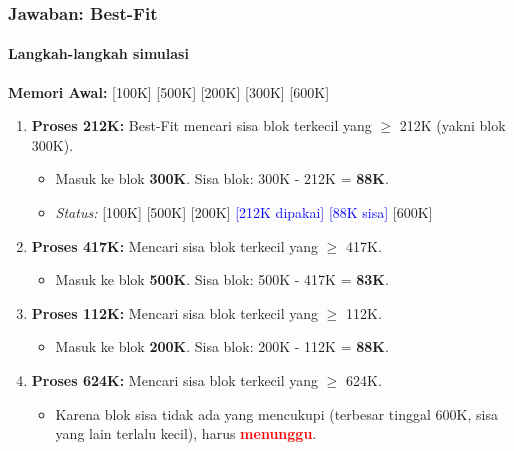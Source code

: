 \documentclass[t,aspectratio=169,xcolor=dvipsnames]{beamer}
\newcommand{\tem}[1]{\textbf{\textcolor{red}{#1}}}
\begin{document}
\begin{frame}
    \frametitle{Jawaban: Best-Fit}
    \framesubtitle{Langkah-langkah simulasi}
    \small
    \textbf{Memori Awal:} [100K] [500K] [200K] [300K] [600K]
    
    \begin{enumerate}
        \item \textbf{Proses 212K:} Best-Fit mencari sisa blok terkecil yang $\ge$ 212K (yakni blok 300K).
        \begin{itemize}
            \item Masuk ke blok \textbf{300K}. Sisa blok: 300K - 212K = \textbf{88K}.
            \item \textit{Status:} [100K] [500K] [200K] \textcolor{blue}{[212K dipakai] [88K sisa]} [600K]
        \end{itemize}
        \item \textbf{Proses 417K:} Mencari sisa blok terkecil yang $\ge$ 417K.
        \begin{itemize}
            \item Masuk ke blok \textbf{500K}. Sisa blok: 500K - 417K = \textbf{83K}.
        \end{itemize}
        \item \textbf{Proses 112K:} Mencari sisa blok terkecil yang $\ge$ 112K.
        \begin{itemize}
            \item Masuk ke blok \textbf{200K}. Sisa blok: 200K - 112K = \textbf{88K}.
        \end{itemize}
        \item \textbf{Proses 624K:} Mencari sisa blok terkecil yang $\ge$ 624K.
        \begin{itemize}
            \item Karena blok sisa tidak ada yang mencukupi (terbesar tinggal 600K, sisa yang lain terlalu kecil), harus \tem{menunggu}.
        \end{itemize}
    \end{enumerate}
\end{frame}
\end{document}
